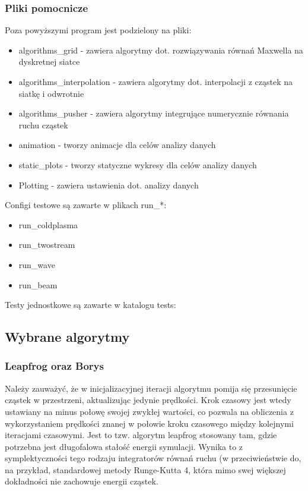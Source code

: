 \subsubsection{Pliki pomocnicze}
Poza powyższymi program jest podzielony na pliki:
\begin{itemize}
\item algorithms\_grid - zawiera algorytmy dot. rozwiązywania równań Maxwella na dyskretnej siatce
\item algorithms\_interpolation - zawiera algorytmy dot. interpolacji z cząstek na siatkę i odwrotnie
\item algorithms\_pusher - zawiera algorytmy integrujące numerycznie równania ruchu cząstek
\item animation - tworzy animacje dla celów analizy danych
\item static\_plots - tworzy statyczne wykresy dla celów analizy danych
\item Plotting - zawiera ustawienia dot. analizy danych %
\end{itemize}

Configi testowe są zawarte w plikach run\_*: %
\begin{itemize}
\item run\_coldplasma
\item run\_twostream
\item run\_wave
\item run\_beam
\end{itemize}

Testy jednostkowe są zawarte w katalogu tests:

\subsection{Wybrane algorytmy}

\subsubsection{Leapfrog oraz Borys} %
Należy zauważyć, że w inicjalizacyjnej iteracji algorytmu pomija się przesunięcie cząstek w przestrzeni, aktualizując jedynie
prędkości. Krok czasowy jest wtedy ustawiany na minus połowę swojej zwykłej wartości, co pozwala na obliczenia
z wykorzystaniem prędkości znanej w połowie kroku czasowego między kolejnymi iteracjami czasowymi. Jest to tzw. algorytm
leapfrog %
stosowany tam, gdzie potrzebna jest długofalowa stałość energii symulacji. Wynika to z symplektyczności %
tego rodzaju integratorów równań ruchu (w przeciwieństwie do, na przykład, standardowej metody Runge-Kutta 4, która
mimo swej większej dokładności nie zachowuje energii cząstek.

